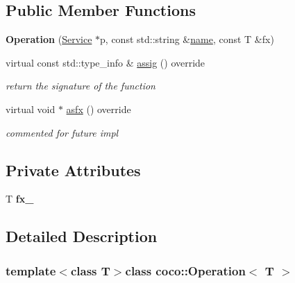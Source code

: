 \subsection*{Public Member Functions}
\begin{DoxyCompactItemize}
\item 
\hypertarget{classcoco_1_1_operation_a4480feab07c13ab9948fa19bd13ca9a4}{}{\bfseries Operation} (\hyperlink{classcoco_1_1_service}{Service} $\ast$p, const std\+::string \&\hyperlink{classcoco_1_1_operation_base_aee0ff9e503d67abe3260e808fec4a183}{name}, const T \&fx)\label{classcoco_1_1_operation_a4480feab07c13ab9948fa19bd13ca9a4}

\item 
\hypertarget{classcoco_1_1_operation_af0f8b44b60dc70ec7f16becea30cf6f8}{}virtual const std\+::type\+\_\+info \& \hyperlink{classcoco_1_1_operation_af0f8b44b60dc70ec7f16becea30cf6f8}{assig} () override\label{classcoco_1_1_operation_af0f8b44b60dc70ec7f16becea30cf6f8}

\begin{DoxyCompactList}\small\item\em return the signature of the function \end{DoxyCompactList}\item 
virtual void $\ast$ \hyperlink{classcoco_1_1_operation_a14160906142cffe52eaf2899dcd89c97}{asfx} () override
\begin{DoxyCompactList}\small\item\em commented for future impl \end{DoxyCompactList}\end{DoxyCompactItemize}
\subsection*{Private Attributes}
\begin{DoxyCompactItemize}
\item 
\hypertarget{classcoco_1_1_operation_acccf803b570558885b87da7bcbd633be}{}T {\bfseries fx\+\_\+}\label{classcoco_1_1_operation_acccf803b570558885b87da7bcbd633be}

\end{DoxyCompactItemize}


\subsection{Detailed Description}
\subsubsection*{template$<$class T$>$class coco\+::\+Operation$<$ T $>$}

